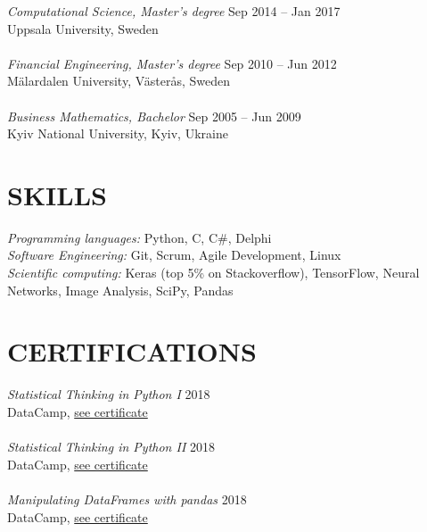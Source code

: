 \documentclass[margin, 10pt]{res} %
\begin{document}
\begin{resume}
{\sl Computational Science, Master's degree} \hfill Sep 2014 -- Jan 2017 \\
Uppsala University, Sweden\\ \\
{\sl Financial Engineering, Master's degree} \hfill Sep 2010 -- Jun 2012 \\
M{\"a}lardalen University, V{\"a}ster{\aa}s, Sweden\\ \\
{\sl Business Mathematics, Bachelor} \hfill Sep 2005 -- Jun 2009 \\
Kyiv National University, Kyiv, Ukraine\\ 



\section{SKILLS}
{\sl Programming languages: } Python, C, C\#, Delphi \\
{\sl Software Engineering: } Git, Scrum, Agile Development, Linux \\
{\sl Scientific computing: } Keras (top 5\% on Stackoverflow), TensorFlow, Neural Networks, Image Analysis, SciPy, Pandas
\pagebreak
 
\section{CERTIFICATIONS}  
\bigskip
{\sl Statistical Thinking in Python I} \hfill 2018 \\
DataCamp, \href{https://www.datacamp.com/statement-of-accomplishment/course/26d7d4322b1819ca476d42047f2560da16a0d09b}{see certificate} \\\\ 
{\sl Statistical Thinking in Python II} \hfill 2018 \\
DataCamp, \href{https://www.datacamp.com/statement-of-accomplishment/course/0361db1eb15e9ddeb5fd778d93a2e0b93e3927b1}{see certificate} \\\\ 
{\sl Manipulating DataFrames with pandas} \hfill 2018 \\
DataCamp, \href{https://www.datacamp.com/statement-of-accomplishment/course/7508f1816070bc730dd15d8440f2bbb87bf3674f}{see certificate} \\ 



\end{resume}
\end{document}
